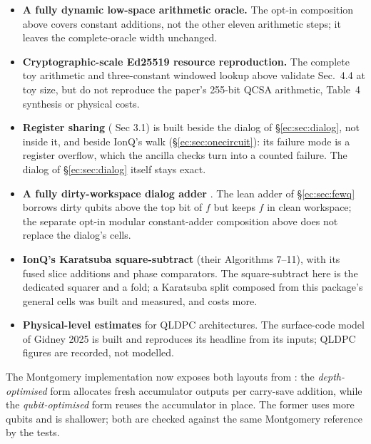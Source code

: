 \documentclass[11pt]{article}
\theoremstyle{plain}
\theoremstyle{remark}
\begin{document}
\begin{itemize}\setlength\itemsep{2pt}
\item \textbf{A fully dynamic low-space arithmetic oracle.} The opt-in
composition above covers constant additions, not the other eleven
arithmetic steps; it leaves the complete-oracle width unchanged.
\item \textbf{Cryptographic-scale Ed25519 resource reproduction.}
The complete toy arithmetic and three-constant windowed lookup above validate
\cite{ec:kim26} Sec.~4.4 at toy size, but do not reproduce the paper's
255-bit QCSA arithmetic, Table~4 synthesis or physical costs.
\item \textbf{Register sharing} (\cite{ec:schrott26} Sec 3.1) is built beside the dialog of
\S\ref{ec:sec:dialog}, not inside it, and beside IonQ's walk (\S\ref{ec:sec:onecircuit}): its
failure mode is a register overflow, which the ancilla checks turn into a counted failure. The
dialog of \S\ref{ec:sec:dialog} itself stays exact.
\item \textbf{A fully dirty-workspace dialog adder} \cite{ec:gidney25}. The
lean adder of \S\ref{ec:sec:fewq} borrows dirty qubits above the top bit of
$f$ but keeps $f$ in clean workspace; the separate opt-in modular
constant-adder composition above does not replace the dialog's cells.
\item \textbf{IonQ's Karatsuba square-subtract} (their Algorithms 7--11), with its fused slice
additions and phase comparators. The square-subtract here is the dedicated squarer and a fold; a
Karatsuba split composed from this package's general cells was built and measured, and costs more.
\item \textbf{Physical-level estimates} for QLDPC architectures. The surface-code model of
Gidney 2025 is built and reproduces its headline from its inputs; QLDPC figures are recorded, not
modelled.
\end{itemize}

\noindent
The Montgomery implementation now exposes both layouts from \cite{ec:kim26}: the
\emph{depth-optimised} form allocates fresh accumulator outputs per carry-save addition, while the
\emph{qubit-optimised} form reuses the accumulator in place. The former uses more qubits and is
shallower; both are checked against the same Montgomery reference by the tests.
\end{document}
